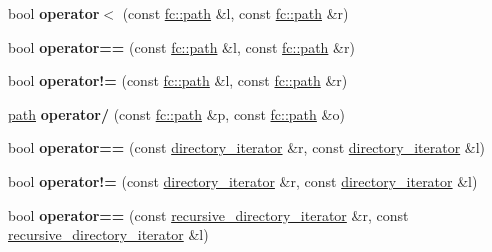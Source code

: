 \begin{DoxyCompactItemize}
\item 
\mbox{\label{namespacefc_a2450bb19b2a45352f86130699b835672}} 
bool {\bfseries operator$<$} (const \mbox{\hyperlink{classfc_1_1path}{fc\+::path}} \&l, const \mbox{\hyperlink{classfc_1_1path}{fc\+::path}} \&r)
\item 
\mbox{\label{namespacefc_ac659259ecdcc185b38a01acbd4749aad}} 
bool {\bfseries operator==} (const \mbox{\hyperlink{classfc_1_1path}{fc\+::path}} \&l, const \mbox{\hyperlink{classfc_1_1path}{fc\+::path}} \&r)
\item 
\mbox{\label{namespacefc_a6ac1600a45a010b76941dcfb6d6c7d79}} 
bool {\bfseries operator!=} (const \mbox{\hyperlink{classfc_1_1path}{fc\+::path}} \&l, const \mbox{\hyperlink{classfc_1_1path}{fc\+::path}} \&r)
\item 
\mbox{\label{namespacefc_a624adb190a96ac38b54d4eed4f6e42e3}} 
\mbox{\hyperlink{classfc_1_1path}{path}} {\bfseries operator/} (const \mbox{\hyperlink{classfc_1_1path}{fc\+::path}} \&p, const \mbox{\hyperlink{classfc_1_1path}{fc\+::path}} \&o)
\item 
\mbox{\label{namespacefc_ae42d80da6bb25750019a5738fef8e016}} 
bool {\bfseries operator==} (const \mbox{\hyperlink{classfc_1_1directory__iterator}{directory\+\_\+iterator}} \&r, const \mbox{\hyperlink{classfc_1_1directory__iterator}{directory\+\_\+iterator}} \&l)
\item 
\mbox{\label{namespacefc_ad32f2fa0d0979a05754dc1759880c748}} 
bool {\bfseries operator!=} (const \mbox{\hyperlink{classfc_1_1directory__iterator}{directory\+\_\+iterator}} \&r, const \mbox{\hyperlink{classfc_1_1directory__iterator}{directory\+\_\+iterator}} \&l)
\item 
\mbox{\label{namespacefc_adeb2fec49ce8bb1a1f0ca6401b2d0257}} 
bool {\bfseries operator==} (const \mbox{\hyperlink{classfc_1_1recursive__directory__iterator}{recursive\+\_\+directory\+\_\+iterator}} \&r, const \mbox{\hyperlink{classfc_1_1recursive__directory__iterator}{recursive\+\_\+directory\+\_\+iterator}} \&l)
\item 
\mbox{\label{namespacefc_a3013e4b45b5a0430cb0a692b05ac8a51}} 

\end{DoxyCompactItemize}
